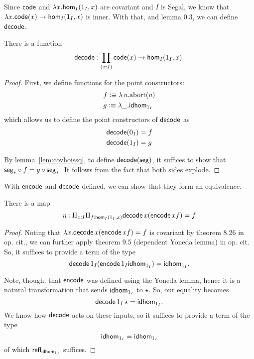 \documentclass[main.tex]{subfiles}
\begin{document}
Since $\co$ and $\lambda x. \ho[I]{1_I}{x}$ are covariant and $I$ is Segal, we know that $\lambda x. \co(x) \to \ho[I]{1_I}{x}$ is inner. With that, and lemma 0.3, we can define $\dco$.
\begin{lemma}
    There is a function $$\dco : \prod_{(x:I)}\co(x) \to \ho[I]{1_I}{x}.$$
\end{lemma}
\begin{proof}
First, we define functions for the point constructors:
\begin{align*}
    &f \defeq \lambda\, u. \text{abort}(u)\\
    &g \defeq \lambda \_ . \idhom{1_I}
\end{align*}
which allows us to define the point constructors of $\dco$ as
\begin{align*}
    &\dco(0_I) = f\\
    &\dco(1_I) = g\\
\end{align*}

By lemma~\ref{lem:covhoissq}, to define $\dco(\seg)$, it suffices to show that $\seg_*\circ f = g \circ \seg_*$. 
It follows from the fact that both sides explode.
\end{proof}

With $\eco$ and $\dco$ defined, we can show that they form an equivalence.

\begin{lemma}
    There is a map 
    $$ \eta : \Pi_{x : I} \Pi_{f : \ho[I]{1_I}{x}} \normalfont \dco \, x (\eco \, x f) = f$$
\end{lemma}
\begin{proof}
Noting that $\lambda x .\dco \, x (\eco \, x f) = f$ is covariant by theorem 8.26 in op. cit., we can further apply theorem 9.5 (dependent Yoneda lemma) in op. cit. So, it suffices to provide a term of the type
$$\dco \, 1_I (\eco \, 1_I \idhom{1_I}) = \idhom{1_I}.$$

Note, though, that $\eco$ was defined using the Yoneda lemma, hence it is a natural transformation that sends $\idhom{1_I}$ to $\star$. So, our equality becomes $$
\dco \, 1_I \, \star = \idhom{1_I}.$$ We know how $\dco$ acts on these inputs, so it suffices to provide a term of the type
$$\idhom{1_I} = \idhom{1_I}$$
of which $\refl{\idhom{1_I}}$ suffices.
\end{proof}
\end{document}
